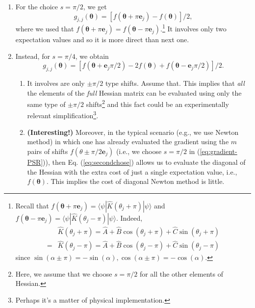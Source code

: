 \begin{enumerate}
    \item For the choice $s=\pi / 2$, we get
\begin{equation}
    g_{j, j}(\boldsymbol{\theta})=\left[f\left(\boldsymbol{\theta}+\pi \mathbf{e}_j\right)-f(\boldsymbol{\theta})\right] / 2,
\end{equation}
where we used that $f\left(\boldsymbol{\theta}+\pi \mathbf{e}_j\right)=f\left(\boldsymbol{\theta}-\pi \mathbf{e}_j\right)$.\footnote{Recall that $f\left(\boldsymbol{\theta}+\pi \mathbf{e}_j\right)=\langle\psi| \hat{K}(\theta_j+\pi)|\psi\rangle$ and $f\left(\boldsymbol{\theta}-\pi \mathbf{e}_j\right)=\langle\psi| \hat{K}(\theta_j-\pi)|\psi\rangle$. Indeed, 
\begin{align}
& \hat{K}\left(\theta_j+\pi\right)=\hat{A}+\hat{B} \cos \left(\theta_j+\pi\right)+\hat{C} \sin \left(\theta_j+\pi\right) \\
= & \hat{K}\left(\theta_j-\pi\right)=\hat{A}+\hat{B} \cos \left(\theta_j-\pi\right)+\hat{C} \sin \left(\theta_j-\pi\right)
\end{align}
since $\sin (\alpha \pm \pi)=-\sin (\alpha),\cos (\alpha \pm \pi)=-\cos (\alpha) .$} It involves only two expectation values and so it is more direct than next one.
    \item Instead, for $s=\pi / 4$, we obtain
\begin{equation}\label{eq:secondchose}
    g_{j, j}(\boldsymbol{\theta})=\left[f\left(\boldsymbol{\theta}+\mathbf{e}_j \pi / 2\right)-2 f(\boldsymbol{\theta})+f\left(\boldsymbol{\theta}-\mathbf{e}_j \pi / 2\right)\right] / 2 .
\end{equation}
\begin{enumerate}
    \item It involves are only $\pm \pi / 2$ type shifts. Assume that. This implies that \textit{all} the elements of the \textit{full} Hessian matrix can be evaluated using only the same type of $\pm \pi / 2$ shifts\footnote{Here, we assume that we choose $s=\pi / 2$ for all the other elements of Hessian.} and this fact could be an experimentally relevant simplification\footnote{Perhaps it's a matter of physical implementation.}.
    \item \textbf{(Interesting!)} Moreover, in the typical scenario (e.g., we use Newton method) in which one has already evaluated the gradient using the $m$ pairs of shifts $f\left(\theta \pm \pi / 2 \mathbf{e}_j\right)$ (i.e., we choose $s=\pi / 2$ in (\ref{eq:gradient-PSR})), then Eq. (\ref{eq:secondchose}) allows us to evaluate the diagonal of the Hessian with the extra cost of just a single expectation value, i.e., $f(\boldsymbol{\theta})$. This implies the cost of diagonal Newton method is little.
\end{enumerate}
\end{enumerate}

